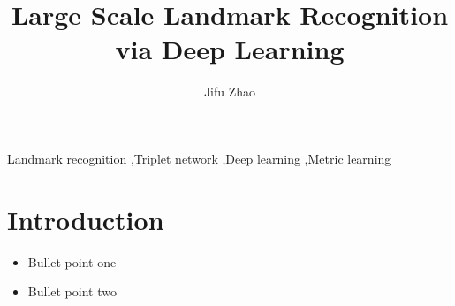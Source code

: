 \documentclass[final,3p]{elsarticle}
\date{}
\begin{document}
\begin{frontmatter}


\title{Large Scale Landmark Recognition via Deep Learning}




\author{Jifu Zhao}

\address{Department of Nuclear, Plasma, and Radiological Engineering \\
University of Illinois at Urbana-Champaign, Urbana, Illinois 61801, USA}

\begin{abstract}

\end{abstract}

\begin{keyword}
Landmark recognition \sep Triplet network \sep Deep learning \sep Metric learning

\end{keyword}

\end{frontmatter}


\section{Introduction}
\label{section:introduction}


\begin{itemize}
\item Bullet point one
\item Bullet point two
\end{itemize}
\end{document}
